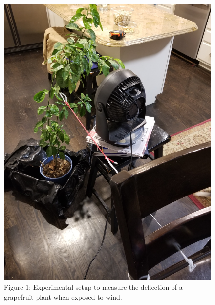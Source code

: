 \documentclass{article}
\begin{document}
\begin{figure}
    \centering
    \includegraphics{Grapefruit_Setup.jpg} 
    \caption{Figure 1: Experimental setup to measure the deflection of a grapefruit plant when exposed to wind.}
\end{figure}
\end{document}
